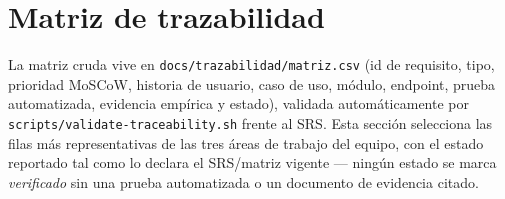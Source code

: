 \chapter{Matriz de trazabilidad}
\label{cap:trazabilidad-final}

La matriz cruda vive en \texttt{docs/trazabilidad/matriz.csv} (id de
requisito, tipo, prioridad MoSCoW, historia de usuario, caso de uso,
m\'odulo, endpoint, prueba automatizada, evidencia emp\'irica y estado),
validada autom\'aticamente por \texttt{scripts/validate-traceability.sh}
frente al SRS. Esta secci\'on selecciona las filas m\'as representativas de
las tres \'areas de trabajo del equipo, con el estado reportado tal como lo
declara el SRS/matriz vigente --- ning\'un estado se marca
\emph{verificado} sin una prueba automatizada o un documento de evidencia
citado.

